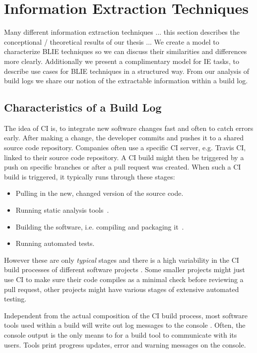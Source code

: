 \documentclass[\myrootdir/main.tex]{subfiles}
\begin{document}
\chapter{Information Extraction Techniques}
\label{sec:models}
Many different information extraction techniques ... this section describes the conceptional / theoretical results of our thesis ...
We create a model to characterize BLIE techniques so we can discuss their similarities and differences more clearly.
Additionally we present a complimentary model for IE tasks, to describe use cases for BLIE techniques in a structured way.
From our analysis of build logs we share our notion of the extractable information within a build log.

\section{Characteristics of a Build Log}
The idea of CI is, to integrate new software changes fast and often to catch errors early. After making a change, the developer commits and pushes it to a shared source code repository. Companies often use a specific CI server, e.g. Travis CI, linked to their source code repository. A CI build might then be triggered by a push on specific branches or after a pull request was created. When such a CI build is triggered, it typically runs through these stages:
\begin{itemize}
	\item Pulling in the new, changed version of the source code.
	\item Running static analysis tools~\cite{zampetti2017open}.
	\item Building the software, i.e. compiling and packaging it~\cite{phillips2014understanding}.
	\item Running automated tests.
\end{itemize}
However these are only \emph{typical} stages and there is a high variability in the CI build processes of different software projects . Some smaller projects might just use CI to make sure their code compiles as a minimal check before reviewing a pull request, other projects might have various stages of extensive automated testing.

Independent from the actual composition of the CI build process, most software tools used within a build will write out log messages to the console . Often, the console output is the only means to for a build tool to communicate with its users. Tools print progress updates, error and warning messages on the console.
\end{document}
